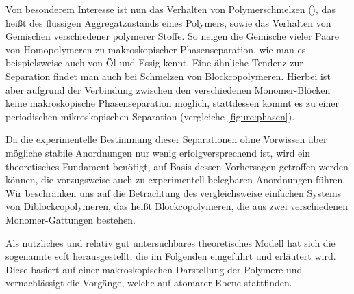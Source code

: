 \documentclass[../main.tex]{subfiles}
\begin{document}
Von besonderem Interesse ist nun das Verhalten von Polymerschmelzen (), das heißt des flüssigen Aggregatzustands eines Polymers, sowie das Verhalten von Gemischen verschiedener polymerer Stoffe.
So neigen die Gemische vieler Paare von Homopolymeren zu makroskopischer Phasenseparation, wie man es beispielsweise auch von Öl und Essig kennt.
Eine ähnliche Tendenz zur Separation findet man auch bei Schmelzen von Blockcopolymeren.
Hierbei ist aber aufgrund der Verbindung zwischen den verschiedenen Monomer-Blöcken keine makroskopische Phasenseparation möglich, stattdessen kommt es zu einer periodischen mikroskopischen Separation (vergleiche \cref{figure:phasen}).

Da die experimentelle Bestimmung dieser Separationen ohne Vorwissen über mögliche stabile Anordnungen nur wenig erfolgversprechend ist, wird ein theoretisches Fundament benötigt, auf Basis dessen Vorhersagen getroffen werden können, die vorzugsweise auch zu experimentell belegbaren Anordnungen führen.
Wir beschränken uns auf die Betrachtung des vergleichsweise einfachen Systems von Diblockcopolymeren, das heißt Blockcopolymeren, die aus zwei verschiedenen Monomer-Gattungen bestehen.

Als nützliches und relativ gut untersuchbares theoretisches Modell hat sich die sogenannte \ac{scft} herausgestellt, die im Folgenden eingeführt und erläutert wird.
Diese basiert auf einer makroskopischen Darstellung der Polymere und vernachlässigt die Vorgänge, welche auf atomarer Ebene stattfinden.
\end{document}
